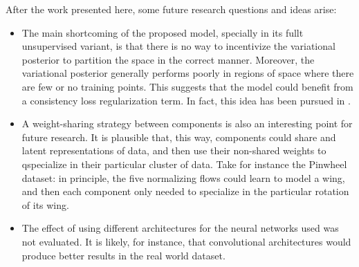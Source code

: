 After the work presented here, some future research questions and ideas
arise:
\begin{itemize}
    \item The main shortcoming of the proposed model, specially in its fullt
    unsupervised variant, is that there is no way to incentivize the variational
    posterior to partition the space in the correct manner. Moreover, the  variational
    posterior generally performs poorly in regions of space where there are few
    or no training points. This suggests that the model could benefit from a consistency
    loss regularization term. In fact, this idea has been pursued in \autocite{semisuplearning_nflows}.
    \item A weight-sharing strategy between components is also an interesting
    point for future research. It is plausible that, this way, components could
    share  and latent representations of data, and then use their
    non-shared weights to q{specialize} in their particular cluster of data. Take
    for instance the Pinwheel dataset: in principle, the five normalizing flows
    could learn to model a wing, and then each component only needed to specialize
    in the particular rotation of its wing.
    \item The effect of using different architectures for the neural networks used
    was not evaluated. It is likely, for instance, that convolutional architectures
    would produce better results in the real world dataset.
\end{itemize}

